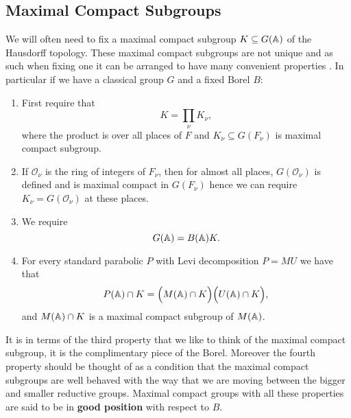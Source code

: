     \subsection{Maximal Compact Subgroups}\label{max_compact_subgroup}
    We will often need to fix a maximal compact subgroup \(K\subseteq G(\A)\) of the Hausdorff topology. These maximal compact subgroups are not unique and as such when fixing one it can be arranged to have many convenient properties \cite[I.1.4]{moeglinSpectralDecompositionEisenstein1995}. In particular if we have a classical group \(G\) and a fixed Borel \(B\):
    \begin{enumerate}
        \item First require that 
        \[K = \prod_\nu K_\nu,\]
        where the product is over all places of \(F\) and \(K_\nu\subseteq G(F_\nu)\) is maximal compact subgroup.
        \item If \(\mathcal{O}_\nu\) is the ring of integers of \(F_\nu\), then for almost all places, \(G(\mathcal{O}_{\nu})\) is defined and is maximal compact in \(G(F_\nu)\) hence we can require \(K_\nu = G(\mathcal{O}_{\nu})\) at these places. 
        \item We require 
        \[G(\A) = B(\A)K.\]
        \item For every standard parabolic \(P \) with Levi decomposition \(P=MU\) we have that 
        \[P(\A)\cap K = \Bigl( M(\A)\cap K \Bigr) \Bigl( U(\A)\cap K \Bigr),\]
        and \(M(\A)\cap K\) is a maximal compact subgroup of \(M(\A)\).
    \end{enumerate}
     It is in terms of the third property that we like to think of the maximal compact subgroup, it is the complimentary piece of the Borel. Moreover the fourth property should be thought of as a condition that the maximal compact subgroups are well behaved with the way that we are moving between the bigger and smaller reductive groups.
    Maximal compact groups with all these properties are said to be in \textbf{good position} with respect to \(B\).
    
